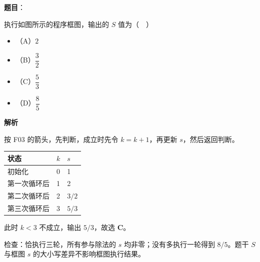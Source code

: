 \begin{answer}

\textbf{题目}：

执行如图所示的程序框图，输出的 $S$ 值为（　）
\nopagebreak[4]
\begin{center}\end{center}
\nopagebreak[4]
\begin{itemize}
\item （A）$2$
\item （B）$\dfrac32$
\item （C）$\dfrac53$
\item （D）$\dfrac85$
\end{itemize}

\textbf{解析}

按 F03 的箭头，先判断，成立时先令 $k=k+1$，再更新 $s$，然后返回判断。

\begin{center}
\begin{tabular}{lll}
\toprule
状态 & $k$ & $s$ \\
\midrule
初始化 & 0 & 1 \\
第一次循环后 & 1 & 2 \\
第二次循环后 & 2 & $3/2$ \\
第三次循环后 & 3 & $5/3$ \\
\bottomrule
\end{tabular}
\end{center}

此时 $k<3$ 不成立，输出 $5/3$，故选 \textbf{C}。

检查：恰执行三轮，所有参与除法的 $s$ 均非零；没有多执行一轮得到 $8/5$。题干 $S$ 与框图 $s$ 的大小写差异不影响框图执行结果。


\end{answer}
